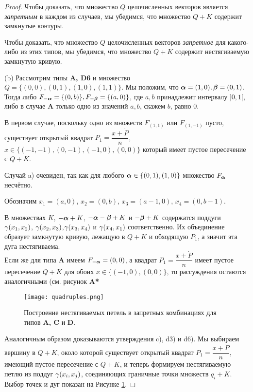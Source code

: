 \begin{proof} 
Чтобы доказать, что множество $Q$ целочисленных векторов является {\em запретным} в каждом из случаев, мы убедимся, что множество $Q+K$ содержит замкнутые контуры.

Чтобы доказать, что множество $Q$ целочисленных векторов {\em запретное} для какого-либо из этих типов, мы убедимся, что множество $Q+K$ содержит нестягиваемую замкнутую  кривую.

(b)  Рассмотрим типы {\bf A, D6} и множество $Q=\{(0,0), (0,1), (1,0), (1,1)\}$. Мы положим, что ${\bm{\alpha}}=(1,0), {\bm{\beta}}=(0,1)$. Тогда   либо $F_{-{\bm{\alpha}}}=\{(0,b)\}, F_{-{\bm{\beta}}}=\{(a,0)\}$, где $a,b$ принадлежит интервалу $]0,1[$,  либо в случае {\bf A} только одно из значений $a,b$, скажем $b$, равно 0.


В первом случае, поскольку одно из множеств $F_{(1,1)}$ или $F_{(1,-1)}$ пусто, существует открытый квадрат $P_1=\dfrac{x+\dot P}{n}$, $x\in \{(-1,-1),(0,-1), (-1,0), (0,0)\}$ который имеет пустое пересечение  с $Q+K$. 

Случай a) очевиден, так как для любого ${\bm{\alpha}}\in\{(0,1),(1,0)\}$ множество $F_{\bm{\alpha}}$ несчётно.

Обозначим $x_1=(a,0)$, 
$x_2=(0,b)$, $x_3=(a-1,0)$, $x_4=(0,b-1)$. 

 В множествах  $K$, $-{\bm{\alpha}}+K$, $-{\bm{\alpha}}-{\bm{\beta}}+K$ и $-{\bm{\beta}}+K$ содержатся поддуги  $\gamma(x_1,x_2)$, $\gamma(x_2,x_3)$,$\gamma(x_3,x_4)$ и $\gamma(x_4,x_1)$ соответственно. Их объединение
 образует замкнутую кривую, лежащую в $Q+K$ и обходящую $P_1$, а значит эта дуга нестягиваема.\\ 

Если же для типа {\bf A} имеем $F_{-{\bm{\alpha}}}=(0,0)$, а квадрат $P_1=\dfrac{x+\dot P}{n}$ имеет пустое пересечение $Q+K$ для обоих $x\in\{(-1,0), (0,0)\}$, то рассуждения остаются аналогичными (см. рисунок {\bf A*}

\begin{figure}[H] 
    \centering
    \texttt{[image: quadruples.png]}
    \caption{Построение нестягиваемых петель в запретных комбинациях для типов {\bf A, C} и {\bf D}.}
    \label{forbid}
\end{figure}

Аналогичным образом доказываются утверждения c), d3) и d6).
Мы выбираем вершину в $Q+K$, около которой существует открытый квадрат $P_1=\dfrac{x+\dot P}{n}$, имеющий пустое пересечение с $Q+K$, и теперь формируем нестягиваемую петлю из поддуг $\gamma(x_i,x_j)$, соединяющих граничные точки множеств $q_i+K$.
Выбор точек и дуг показан на Рисунке \ref{forbid}.
\end{proof}


